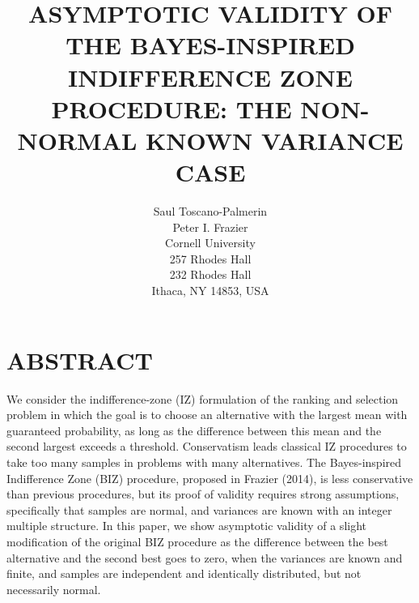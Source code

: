 \documentclass{wscpaperproc}
\theoremstyle{wsc}
\begin{document}
%
%

\title{ASYMPTOTIC VALIDITY OF THE BAYES-INSPIRED INDIFFERENCE ZONE PROCEDURE: 
THE NON-NORMAL KNOWN VARIANCE CASE}




\author{
	Saul Toscano-Palmerin\\ 
    	Peter I. Frazier\\[12pt]
	Cornell University \\
	257 Rhodes Hall \\
	232 Rhodes Hall \\
	Ithaca, NY 14853, USA\\
}





\maketitle



\section*{ABSTRACT}
We consider the indifference-zone (IZ) formulation of the ranking and selection problem in which the goal is to choose an alternative with the largest mean with guaranteed probability, as long as the difference between this mean and the second largest exceeds a threshold.
Conservatism leads classical IZ procedures to take too many samples in problems with many alternatives. The Bayes-inspired
Indifference Zone (BIZ) procedure, proposed in Frazier (2014), is
less conservative than previous procedures, but its proof of validity
requires strong assumptions, specifically that samples are normal, and variances are known 
with an integer multiple structure. In this paper, 
we show asymptotic validity of a slight modification of the original BIZ procedure 
as the difference between the best alternative and the second best goes to zero,
when the variances are known and finite, and samples are independent and identically distributed, but not necessarily normal.
\end{document}
